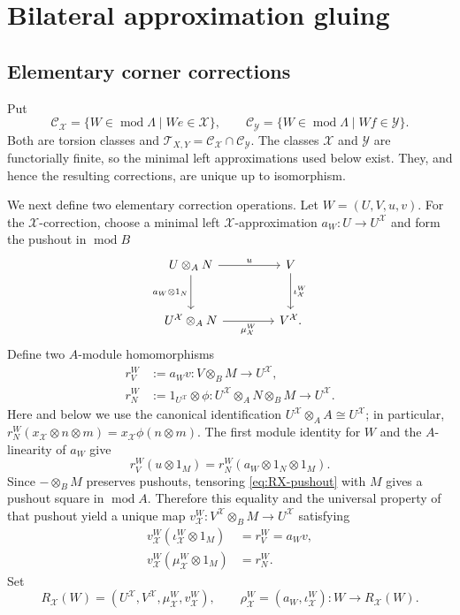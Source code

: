 \documentclass[11pt,reqno]{amsart}
\theoremstyle{definition}
\theoremstyle{remark}
\newcommand{\modu}{\operatorname{mod}}
\numberwithin{equation}{section}
\begin{document}
\section{Bilateral approximation gluing}

\subsection{Elementary corner corrections}

Put
\[
 \mathcal C_{\mathcal X}
 =\{W\in\modu\Lambda\mid We\in\mathcal X\},
 \qquad
 \mathcal C_{\mathcal Y}
 =\{W\in\modu\Lambda\mid Wf\in\mathcal Y\}.
\]
Both are torsion classes and
$\mathcal T_{X,Y}=\mathcal C_{\mathcal X}\cap\mathcal C_{\mathcal Y}$.
The classes $\mathcal X$ and $\mathcal Y$ are functorially finite, so the
minimal left approximations used below exist.  They, and hence the resulting
corrections, are unique up to isomorphism.

We next define two elementary correction operations.  Let
$W=(U,V,u,v)$.  For the $\mathcal X$-correction, choose a minimal left
$\mathcal X$-approximation $a_W:U\to U^{\mathcal X}$ and form the pushout
in $\modu B$
\begin{equation}\label{eq:RX-pushout}
\begin{tikzcd}[column sep=4.2em,row sep=2.8em]
 U\otimes_AN \arrow[r,"u"]\arrow[d,"a_W\otimes1_N"']
 &V\arrow[d,"\iota_{\mathcal X}^W"]\\
 U^{\mathcal X}\otimes_AN
 \arrow[r,"\mu_{\mathcal X}^W"']&V^{\mathcal X} .
\end{tikzcd}
\end{equation}
Define two $A$-module homomorphisms
\begin{align*}
 r_V^W&:=a_Wv:V\otimes_BM\longrightarrow U^{\mathcal X},\\
 r_N^W&:=1_{U^{\mathcal X}}\otimes\phi:
 U^{\mathcal X}\otimes_AN\otimes_BM\longrightarrow U^{\mathcal X}.
\end{align*}
Here and below we use the canonical identification
$U^{\mathcal X}\otimes_AA\cong U^{\mathcal X}$; in particular,
$r_N^W(x_{\mathcal X}\otimes n\otimes m)
=x_{\mathcal X}\phi(n\otimes m)$.
The first module identity for $W$ and the $A$-linearity of $a_W$ give
\[
 r_V^W(u\otimes1_M)
 =r_N^W(a_W\otimes1_N\otimes1_M).
\]
Since $-\otimes_BM$ preserves pushouts, tensoring
\eqref{eq:RX-pushout} with $M$ gives a pushout square in $\modu A$.
Therefore this equality and the universal property of that pushout yield a
unique map
$v_{\mathcal X}^W:V^{\mathcal X}\otimes_BM\to U^{\mathcal X}$ satisfying
\begin{align*}
 v_{\mathcal X}^W(\iota_{\mathcal X}^W\otimes1_M)
 &=r_V^W=a_Wv,\\
 v_{\mathcal X}^W(\mu_{\mathcal X}^W\otimes1_M)
 &=r_N^W.
\end{align*}
Set
\[
 R_{\mathcal X}(W)
 =(U^{\mathcal X},V^{\mathcal X},
   \mu_{\mathcal X}^W,v_{\mathcal X}^W),
 \qquad
 \rho_{\mathcal X}^W=(a_W,\iota_{\mathcal X}^W):
 W\longrightarrow R_{\mathcal X}(W).
\]
\end{document}
